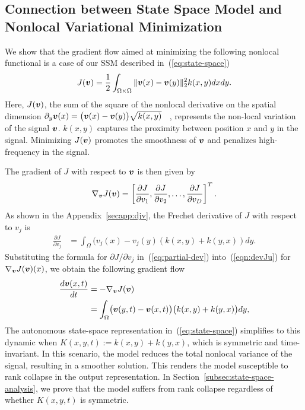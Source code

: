 \vspace{-2mm}
\subsection{Connection between State Space Model and Nonlocal Variational Minimization}
\label{subsec:smooth-state-space}

We show that the gradient flow aimed at minimizing the following nonlocal functional is a case of our SSM described in~(\ref{eq:state-space})
\begin{equation}
    J({\bm v}) = \frac{1}{2} \int_{\Omega \times \Omega} \|{\bm v}(x) - {\bm v}(y)\|_2^2 k(x, y)dxdy.
\end{equation}
Here, $J({\bm v})$, the sum of the square of the nonlocal derivative on the spatial dimension $\partial_y{\bm v}(x) = \bigl({\bm v}(x) - {\bm v}(y)\bigl)\sqrt{k(x,y)}$~\cite{Gilboa2008NonlocalOW}
, represents the non-local variation of the signal ${\bm v}$. $k(x, y)$ captures the proximity between position $x$ and $y$ in the signal. Minimizing $J({\bm v})$ promotes the smoothness of ${\bm v}$ and penalizes high-frequency in the signal.

The gradient of $J$ with respect to ${\bm v}$ is then given by
\begin{equation}
\begin{aligned}
\label{eqn:devJu}
    \nabla_{{\bm v}} J({\bm v}) = \left[\frac{\partial J}{\partial v_1}, \frac{\partial J}{\partial v_2},  \dots, \frac{\partial J}{\partial v_{D}} \right]^T.
\end{aligned}
\end{equation}
As shown in the Appendix~\ref{secapp:djv}, the Frechet derivative of $J$ with respect to $v_j$ is
\begin{align}  
\label{eq:partial-dev}
\frac{\partial J}{\partial v_j} 
&= \int_{\Omega}(v_j(x) - v_j(y)(k(x, y) + k(y, x))dy. 
\end{align}
Substituting the formula for ${\partial J}/{\partial v_j}$ in~(\ref{eq:partial-dev}) into~(\ref{eqn:devJu}) for $\nabla_{{\bm v}} J({\bm v})(x)$, we obtain the following gradient flow
\begin{equation}
\begin{aligned}
    \label{eq:gradient-descent}
    \frac{d{\bm v}(x,t)}{dt} &= -\nabla_{\bm{v}}J({\bm v}) \\
    &= \int_{\Omega} \bigl(\bm{v}(y,t) - \bm{v}(x,t) \bigl)\bigl(k(x, y) + k(y,x)\bigl)dy,
\end{aligned}
\end{equation}
The autonomous state-space representation in~(\ref{eq:state-space}) simplifies to this dynamic when $K(x, y, t) := k(x, y) + k(y, x)$, which is symmetric and time-invariant. In this scenario, the model reduces the total nonlocal variance of the signal, resulting in a smoother solution. This renders the model susceptible to rank collapse in the output representation. In Section~\ref{subsec:state-space-analysis}, we prove that the model suffers from rank collapse regardless of whether $K(x, y, t)$ is symmetric.

